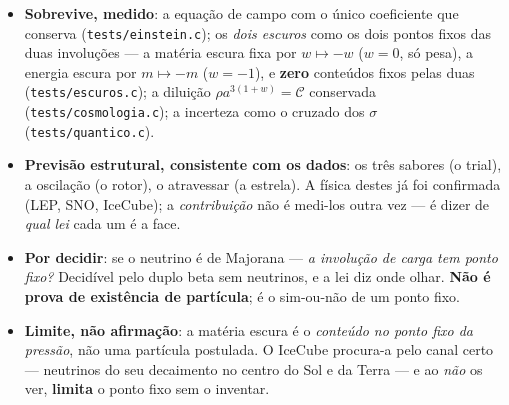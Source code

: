 \documentclass[11pt,a4paper]{article}
\newcommand{\code}[1]{\texttt{\small #1}}
\begin{document}
\begin{itemize}\itemsep3pt
\item \textbf{Sobrevive, medido}: a equação de campo com o único coeficiente que conserva
  (\code{tests/einstein.c}); os \emph{dois escuros} como os dois pontos fixos das duas involuções --- a
  matéria escura fixa por $w\mapsto-w$ ($w=0$, só pesa), a energia escura por $m\mapsto-m$ ($w=-1$), e
  \textbf{zero} conteúdos fixos pelas duas (\code{tests/escuros.c}); a diluição $\rho a^{3(1+w)}=\mathcal C$
  conservada (\code{tests/cosmologia.c}); a incerteza como o cruzado dos $\sigma$ (\code{tests/quantico.c}).
\item \textbf{Previsão estrutural, consistente com os dados}: os três sabores (o trial), a oscilação (o
  rotor), o atravessar (a estrela). A física destes já foi confirmada (LEP, SNO, IceCube); a
  \emph{contribuição} não é medi-los outra vez --- é dizer de \emph{qual lei} cada um é a face.
\item \textbf{Por decidir}: se o neutrino é de Majorana --- \emph{a involução de carga tem ponto fixo?}
  Decidível pelo duplo beta sem neutrinos, e a lei diz onde olhar. \textbf{Não é prova de existência de
  partícula}; é o sim-ou-não de um ponto fixo.
\item \textbf{Limite, não afirmação}: a matéria escura é o \emph{conteúdo no ponto fixo da pressão}, não uma
  partícula postulada. O IceCube procura-a pelo canal certo --- neutrinos do seu decaimento no centro do
  Sol e da Terra --- e ao \emph{não} os ver, \textbf{limita} o ponto fixo sem o inventar.
\end{itemize}
\end{document}
